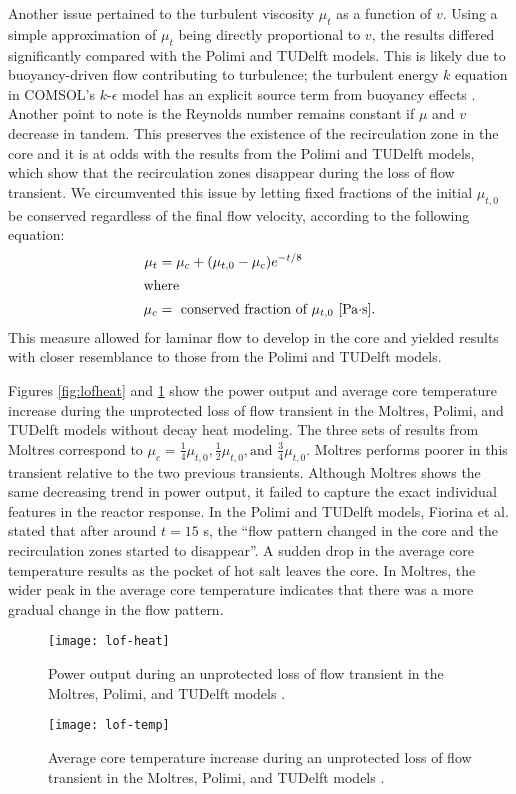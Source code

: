 Another issue pertained to the turbulent viscosity $\mu_t$ as a function of
$v$. Using a simple approximation of $\mu_t$ being directly
proportional to $v$, the results differed significantly compared with the
Polimi and TUDelft models. This is likely due to buoyancy-driven flow
contributing to turbulence; the turbulent energy $k$ equation in COMSOL's
$k$-$\epsilon$ model has an explicit source term from buoyancy effects
\cite{comsol_ab_comsol_2018}. Another point to note is the
Reynolds number remains constant if $\mu$ and $v$ decrease in tandem. This
preserves the existence of the recirculation zone in the core and it is at
odds with the results from the Polimi and TUDelft models, which show that the
recirculation zones disappear during the loss of flow transient. We
circumvented this issue by letting fixed fractions of the initial $\mu_{t,0}$
be conserved regardless of the final flow velocity, according to the following
equation:
%
\begin{align}
    \mu_t &= \mu_c + (\mu_{t,0} - \mu_c) e^{-t/8} \label{lofmu} \\
    \intertext{where}
    \mu_c &= \text{ conserved fraction of $\mu_{t,0}$ [Pa$\cdot$s].} \nonumber
\end{align}
%
This measure allowed for laminar flow to develop in the core and yielded
results with closer resemblance to those from the Polimi and TUDelft models.

Figures \ref{fig:lofheat} and \ref{fig:loftemp} show the power output and
average core temperature increase during the unprotected loss of flow
transient in the Moltres, Polimi, and TUDelft models without decay heat
modeling. The three sets of results from Moltres correspond to $\mu_c =
\frac{1}{4} \mu_{t,0}, \frac{1}{2} \mu_{t,0}, \text{and } \frac{3}{4}
\mu_{t,0}$. Moltres
performs poorer in this transient relative to the two previous transients.
Although Moltres shows the same decreasing trend in power output, it failed to
capture the exact individual features in the reactor response. In the Polimi 
and TUDelft models, Fiorina et al.
stated that after around $t=15$ s, the ``flow pattern changed in the core and
the recirculation zones started to disappear''. A sudden drop in the average
core temperature results as the pocket of hot salt leaves the
core. In Moltres, the wider peak in the average core temperature
indicates that there was a more gradual change in the flow pattern.

\begin{figure}[htbp!]
    \centering
    \texttt{[image: lof-heat]}
    \caption{Power output during
    an unprotected loss of flow transient in the Moltres, Polimi, and
    TUDelft models \cite{fiorina_modelling_2014}.}
    \label{fig:lofheat}
    \texttt{[image: lof-temp]}
    \caption{Average core temperature increase during
    an unprotected loss of flow transient in the Moltres, Polimi, and
    TUDelft models \cite{fiorina_modelling_2014}.}
    \label{fig:loftemp}
\end{figure}


